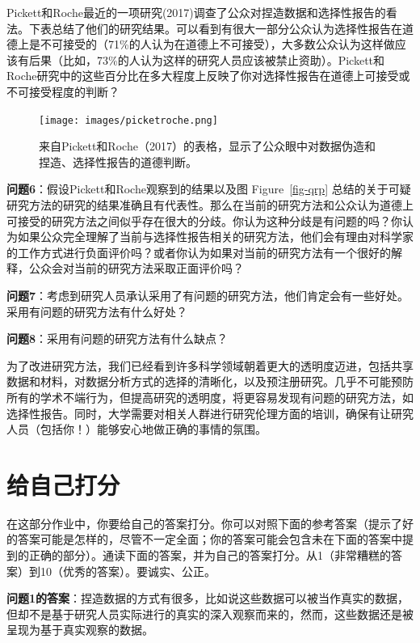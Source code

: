 \documentclass[
  letterpaper,
  DIV=11,
  numbers=noendperiod]{scrreprt}
\begin{document}
Pickett和Roche最近的一项研究(2017)调查了公众对捏造数据和选择性报告的看法。下表总结了他们的研究结果。可以看到有很大一部分公众认为选择性报告在道德上是不可接受的（71\%的人认为在道德上不可接受），大多数公众认为这样做应该有后果（比如，73\%的人认为这样的研究人员应该被禁止资助）。Pickett和Roche研究中的这些百分比在多大程度上反映了你对选择性报告在道德上可接受或不可接受程度的判断？

\begin{figure}

{\centering \texttt{[image: images/picketroche.png]}

}

\caption{\label{fig-pickettroche}来自Pickett和Roche（2017）的表格，显示了公众眼中对数据伪造和捏造、选择性报告的道德判断。}

\end{figure}

\textbf{问题6}：假设Pickett和Roche观察到的结果以及图
Figure~\ref{fig-qrp}
总结的关于可疑研究方法的研究的结果准确且有代表性。那么在当前的研究方法和公众认为道德上可接受的研究方法之间似乎存在很大的分歧。你认为这种分歧是有问题的吗？你认为如果公众完全理解了当前与选择性报告相关的研究方法，他们会有理由对科学家的工作方式进行负面评价吗？或者你认为如果对当前的研究方法有一个很好的解释，公众会对当前的研究方法采取正面评价吗？

\textbf{问题7}：考虑到研究人员承认采用了有问题的研究方法，他们肯定会有一些好处。采用有问题的研究方法有什么好处？

\textbf{问题8}：采用有问题的研究方法有什么缺点？

为了改进研究方法，我们已经看到许多科学领域朝着更大的透明度迈进，包括共享数据和材料，对数据分析方式的选择的清晰化，以及预注册研究。几乎不可能预防所有的学术不端行为，但提高研究的透明度，将更容易发现有问题的研究方法，如选择性报告。同时，大学需要对相关人群进行研究伦理方面的培训，确保有让研究人员（包括你！）能够安心地做正确的事情的氛围。

\hypertarget{ux7ed9ux81eaux5df1ux6253ux5206}{%
\section{给自己打分}\label{ux7ed9ux81eaux5df1ux6253ux5206}}

在这部分作业中，你要给自己的答案打分。你可以对照下面的参考答案（提示了好的答案可能是怎样的，尽管不一定全面；你的答案可能会包含未在下面的答案中提到的正确的部分）。通读下面的答案，并为自己的答案打分。从1（非常糟糕的答案）到10（优秀的答案）。要诚实、公正。

\textbf{问题1的答案}：捏造数据的方式有很多，比如说这些数据可以被当作真实的数据，但却不是基于研究人员实际进行的真实的深入观察而来的，然而，这些数据还是被呈现为基于真实观察的数据。
\end{document}
